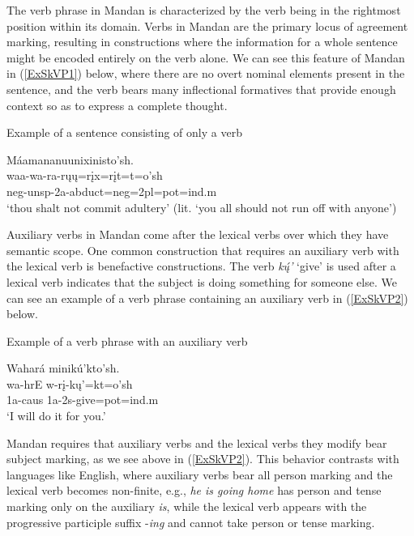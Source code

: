 The verb phrase in Mandan is characterized by the verb being in the rightmost position within its domain. Verbs in Mandan are the primary locus of agreement marking, resulting in constructions where the information for a whole sentence might be encoded entirely on the verb alone. We can see this feature of Mandan in (\ref{ExSkVP1}) below, where there are no overt nominal elements present in the sentence, and the verb bears many inflectional formatives that provide enough context so as to express a complete thought.

\begin{exe}
    \item\label{ExSkVP1} Example of a sentence consisting of only a verb

    \glll Máamananuunixinisto'sh.\\
        waa-wa-ra-rųų=rįx=rįt=t=o'sh\\
        neg-unsp-2a-\textnormal{abduct}=neg=2pl=pot=ind.m\\
        \glt `thou shalt not commit adultery' (lit. `you all should not run off with anyone') \citep[22]{hollow1970}
\end{exe}

Auxiliary verbs in Mandan come after the lexical verbs over which they have semantic scope. One common construction that requires an auxiliary verb with the lexical verb is benefactive constructions. The verb \textit{kų́'} `give' is used after a lexical verb indicates that the subject is doing something for someone else. We can see an example of a verb phrase containing an auxiliary verb in (\ref{ExSkVP2}) below.



\begin{exe}
    \item\label{ExSkVP2} Example of a verb phrase with an auxiliary verb

    \glll Wahará minikú'kto'sh.\\
    wa-hrE w-rį-kų'=kt=o'sh\\
    1a-caus 1a-2s-\textnormal{give}=pot=ind.m\\
    \glt `I will do it for you.' \citep[138]{hollow1973a}
\end{exe}

Mandan requires that auxiliary verbs and the lexical verbs they modify bear subject marking, as we see above in (\ref{ExSkVP2}). This behavior contrasts with languages like English, where auxiliary verbs bear all person marking and the lexical verb becomes non-finite, e.g., \textit{he is going home} has person and tense marking only on the auxiliary \textit{is}, while the lexical verb appears with the progressive participle suffix -\textit{ing} and cannot take person or tense marking.


